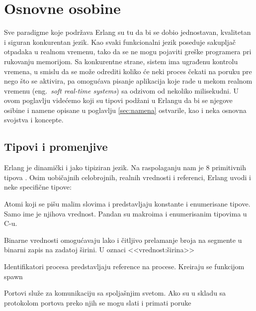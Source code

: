 \documentclass[a4paper]{article}
\begin{document}
{\section{Osnovne osobine}
\label{sec:osobine}
Sve paradigme koje podržava Erlang su tu da bi se dobio jednostavan, kvalitetan i
siguran konkurentan jezik.
Kao svaki funkcionalni jezik poseduje sakupljač otpadaka \cite{book_concurrent} u realnom vremenu, tako da se ne mogu pojaviti greške programera pri rukovanju memorijom. 
Sa konkurentne strane, sistem ima ugrađenu kontrolu vremena, 
u smislu da se može odrediti koliko će neki proces čekati na poruku pre nego što se aktivira, 
pa omogućava pisanje aplikacija koje rade u mekom realnom vremenu (eng.~{\em soft real-time systems}) \cite{book_concurrent} sa odzivom od nekoliko milisekudni. 
U ovom poglavlju videćemo koji su tipovi podžani u Erlangu da bi se njegove osibine i namene opisane u poglavlju \ref{sec:namena} ostvarile, 
kao i neka osnovna svojstva i koncepte.



\subsection{Tipovi i promenjive}
Erlang je dinamički i jako tipiziran jezik. 
Na raspolaganju nam je 8 primitivnih tipova \cite{phdthesis}. 
Osim uobičajnih celobrojnih, realnih vrednosti i referenci, Erlang uvodi i neke specifične tipove:
\begin{list}{•}{}
\item Atomi koji se pišu malim slovima i predstavljaju konstante i enumerisane tipove. Samo ime je njihova vrednost. Pandan su makroima i enumerisanim tipovima u C-u.
\item Binarne vrednosti omogućavaju lako i čitljivo prelamanje broja na segmente u binarni zapis na zadatoj širini. U oznaci <<vrednost:širina>>
\item Identifikatori procesa predstavljaju reference na procese. Kreiraju se funkcijom spawn
\item Portovi služe za komunikaciju sa spoljašnjim svetom. Ako su u skladu sa protokolom portova preko njih se mogu slati i primati poruke
\end{list}
 
}
\end{document}
